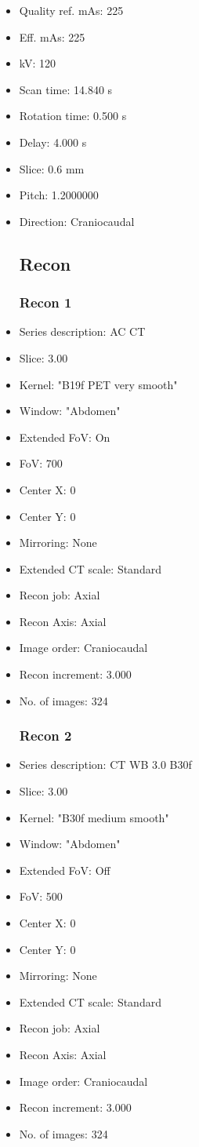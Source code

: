 \documentclass[12pt]{article}
\begin{document}
\begin{itemize}
\subsection{Scan}
\item Quality ref. mAs: 225\item Eff. mAs: 225\item kV: 120\item Scan time: 14.840 s\item Rotation time: 0.500 s\item Delay: 4.000 s\item Slice: 0.6 mm\item Pitch: 1.2000000\item Direction: Craniocaudal
\subsection{Recon}

\subsubsection{Recon 1}
\item Series description: AC CT
\item Slice: 3.00
\item Kernel: "B19f PET very smooth"
\item Window: "Abdomen"
\item Extended FoV: On
\item FoV: 700
\item Center X: 0
\item Center Y: 0
\item Mirroring: None
\item Extended CT scale: Standard
\item Recon job: Axial
\item Recon Axis: Axial
\item Image order: Craniocaudal
\item Recon increment: 3.000
\item No. of images: 324
\subsubsection{Recon 2}
\item Series description: CT WB 3.0 B30f
\item Slice: 3.00
\item Kernel: "B30f medium smooth"
\item Window: "Abdomen"
\item Extended FoV: Off
\item FoV: 500
\item Center X: 0
\item Center Y: 0
\item Mirroring: None
\item Extended CT scale: Standard
\item Recon job: Axial
\item Recon Axis: Axial
\item Image order: Craniocaudal
\item Recon increment: 3.000
\item No. of images: 324

\end{itemize}
\end{document}
